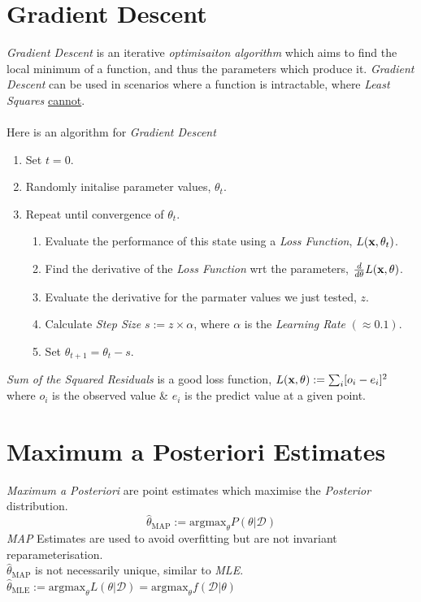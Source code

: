 \documentclass[11pt,a4paper]{article}
\begin{document}
\section{Gradient Descent}
\textit{Gradient Descent} is an iterative \textit{optimisaiton algorithm} which aims to find the local minimum of a function, and thus the parameters which produce it. \textit{Gradient Descent} can be used in scenarios where a function is intractable, where \textit{Least Squares} \underline{cannot}.\\
\\
Here is an algorithm for \textit{Gradient Descent}
\begin{enumerate}
	\item Set $t=0$.
	\item Randomly initalise parameter values, $\theta_t$.
	\item Repeat until convergence of $\theta_t$.
	\begin{enumerate}
		\item Evaluate the performance of this state using a \textit{Loss Function}, $L(\textbf{x},\theta_t)$.
		\item Find the derivative of the \textit{Loss Function} wrt the parameters, $\frac{d}{d\theta}L(\textbf{x},\theta)$.
		\item Evaluate the derivative for the parmater values we just tested, $z$.
		\item Calculate \textit{Step Size} $s:=z\times\alpha$, where $\alpha$ is the \textit{Learning Rate} $(\approx 0.1)$.
		\item Set $\theta_{t+1}=\theta_t-s$.
	\end{enumerate}
\end{enumerate}
\nb \textit{Sum of the Squared Residuals} is a good loss function, $L(\textbf{x},\theta):=\sum_i[o_i-e_i]^2$ where $o_i$ is the observed value \& $e_i$ is the predict value at a given point.

\section{Maximum a Posteriori Estimates}
\textit{Maximum a Posteriori} are point estimates which maximise the \textit{Posterior} distribution.
$$\hat\theta_\text{MAP}:=\text{argmax}_\theta P(\theta|\mathcal{D})$$
\textit{MAP} Estimates are used to avoid overfitting but are not invariant reparameterisation.\\
\nb $\hat\theta_\text{MAP}$ is not necessarily unique, similar to \textit{MLE}.\\
\nb $\hat\theta_\text{MLE}:=\text{argmax}_\theta L(\theta|\mathcal{D})=\text{argmax}_\theta f(\mathcal{D}|\theta)$
\end{document}
